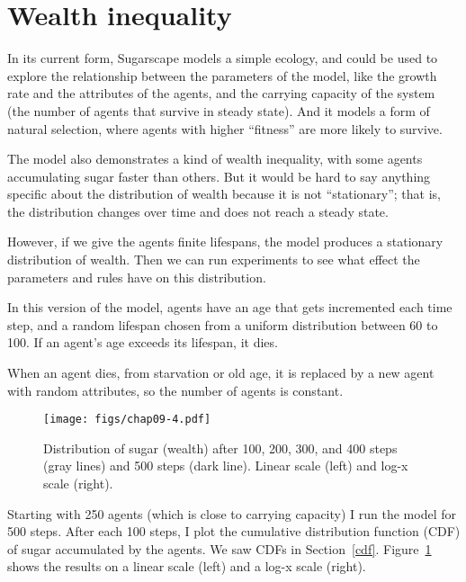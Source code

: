 \documentclass[12pt]{book}
\theoremstyle{exercise}
\begin{document}
\section{Wealth inequality}

In its current form, Sugarscape models a simple ecology, and could
be used to explore the relationship between the parameters of the
model, like the growth rate and the attributes of the agents, and
the carrying capacity of the system (the number of agents that
survive in steady state).  And it models a form of natural selection,
where agents with higher ``fitness'' are more likely to survive.


The model also demonstrates a kind of wealth inequality, with some
agents accumulating sugar faster than others.  But it would be hard
to say anything specific about the distribution of wealth because it
is not ``stationary''; that is, the distribution changes over time and
does not reach a steady state.


However, if we give the agents finite lifespans, the model produces
a stationary distribution of wealth.  Then we can run experiments to
see what effect the parameters and rules have on this distribution.


In this version of the model, agents have an age that gets incremented
each time step, and a random lifespan chosen from a uniform distribution between 60 to 100.  If an agent's age exceeds its lifespan, it dies.

When an agent dies, from starvation or old age, it is replaced by
a new agent with random attributes, so the number of agents is
constant.

\begin{figure}
\centerline{\texttt{[image: figs/chap09-4.pdf]}}
\caption{Distribution of sugar (wealth) after 100, 200, 300, and
400 steps (gray lines) and 500 steps (dark line).  Linear scale (left)
and log-x scale (right). }
\label{chap09-4}
\end{figure}

Starting with 250 agents (which is close to carrying capacity) I run
the model for 500 steps.  After each 100 steps, I plot the cumulative distribution function (CDF) of sugar accumulated by the agents.  We saw CDFs in Section~\ref{cdf}.  Figure~\ref{chap09-4} shows the
results on a linear scale (left) and a log-x scale (right).
\end{document}
